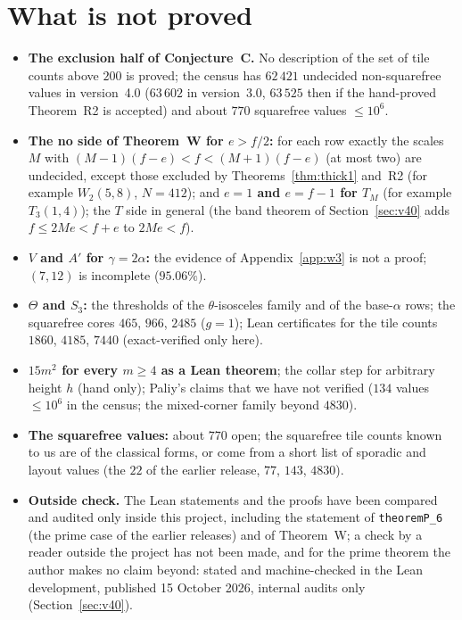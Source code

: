 \documentclass[11pt,reqno]{amsart}
\theoremstyle{plain}
\theoremstyle{definition}
\begin{document}
\section{What is not proved}\label{sec:notproved}
\begin{itemize}
\item \textbf{The exclusion half of Conjecture~C.} No description of the set of tile counts above $200$ is proved; the census has $62\,421$ undecided non-squarefree values in version~4.0 ($63\,602$ in version~3.0, $63\,525$ then if the hand-proved Theorem~R2 is accepted) and about $770$ squarefree values $\le10^6$.
\item \textbf{The no side of Theorem~W for $e>f/2$:} for each row exactly the scales $M$ with $(M-1)(f-e)<f<(M+1)(f-e)$ (at most two) are undecided, except those excluded by Theorems~\ref{thm:thick1} and~R2 (for example $W_2(5,8)$, $N=412$); and \textbf{$e=1$ and $e=f-1$ for $T_M$} (for example $T_3(1,4)$); the $T$ side in general (the band theorem of Section~\ref{sec:v40} adds $f\le2Me<f+e$ to $2Me<f$).
\item \textbf{$V$ and $A'$ for $\gamma=2\alpha$:} the evidence of Appendix~\ref{app:w3} is not a proof; $(7,12)$ is incomplete ($95.06\%$).
\item \textbf{$\Theta$ and $S_3$:} the thresholds of the $\theta$-isosceles family and of the base-$\alpha$ rows; the squarefree cores $465$, $966$, $2485$ ($g=1$); Lean certificates for the tile counts $1860$, $4185$, $7440$ (exact-verified only here).
\item \textbf{$15m^2$ for every $m\ge4$ as a Lean theorem}; the collar step for arbitrary height $h$ (hand only); Paliy's claims that we have not verified ($134$ values $\le10^6$ in the census; the mixed-corner family beyond $4830$).
\item \textbf{The squarefree values:} about $770$ open; the squarefree tile counts known to us are of the classical forms, or come from a short list of sporadic and layout values (the $22$ of the earlier release, $77$, $143$, $4830$).
\item \textbf{Outside check.} The Lean statements and the proofs have been compared and audited only inside this project, including the statement of \texttt{theoremP\_6} (the prime case of the earlier releases) and of Theorem~W; a check by a reader outside the project has not been made, and for the prime theorem the author makes no claim beyond: stated and machine-checked in the Lean development, published 15 October 2026, internal audits only (Section~\ref{sec:v40}).

\end{itemize}
\end{document}
